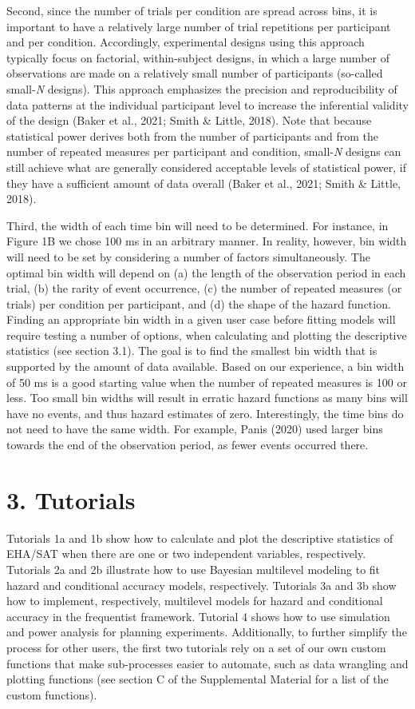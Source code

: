 \documentclass[
  man, donotrepeattitle,floatsintext]{apa6}
\begin{document}
Second, since the number of trials per condition are spread across bins, it is important to have a relatively large number of trial repetitions per participant and per condition. Accordingly, experimental designs using this approach typically focus on factorial, within-subject designs, in which a large number of observations are made on a relatively small number of participants (so-called small-\emph{N} designs). This approach emphasizes the precision and reproducibility of data patterns at the individual participant level to increase the inferential validity of the design (Baker et al., 2021; Smith \& Little, 2018). Note that because statistical power derives both from the number of participants and from the number of repeated measures per participant and condition, small-\emph{N} designs can still achieve what are generally considered acceptable levels of statistical power, if they have a sufficient amount of data overall (Baker et al., 2021; Smith \& Little, 2018).

Third, the width of each time bin will need to be determined.
For instance, in Figure 1B we chose 100 ms in an arbitrary manner.
In reality, however, bin width will need to be set by considering a number of factors simultaneously.
The optimal bin width will depend on (a) the length of the observation period in each trial, (b) the rarity of event occurrence, (c) the number of repeated measures (or trials) per condition per participant, and (d) the shape of the hazard function.
Finding an appropriate bin width in a given user case before fitting models will require testing a number of options, when calculating and plotting the descriptive statistics (see section 3.1). The goal is to find the smallest bin width that is supported by the amount of data available. Based on our experience, a bin width of 50 ms is a good starting value when the number of repeated measures is 100 or less. Too small bin widths will result in erratic hazard functions as many bins will have no events, and thus hazard estimates of zero. Interestingly, the time bins do not need to have the same width. For example, Panis (2020) used larger bins towards the end of the observation period, as fewer events occurred there.

\section{3. Tutorials}\label{tutorials}

Tutorials 1a and 1b show how to calculate and plot the descriptive statistics of EHA/SAT when there are one or two independent variables, respectively. Tutorials 2a and 2b illustrate how to use Bayesian multilevel modeling to fit hazard and conditional accuracy models, respectively. Tutorials 3a and 3b show how to implement, respectively, multilevel models for hazard and conditional accuracy in the frequentist framework. Tutorial 4 shows how to use simulation and power analysis for planning experiments.
Additionally, to further simplify the process for other users, the first two tutorials rely on a set of our own custom functions that make sub-processes easier to automate, such as data wrangling and plotting functions (see section C of the Supplemental Material for a list of the custom functions).
\end{document}
